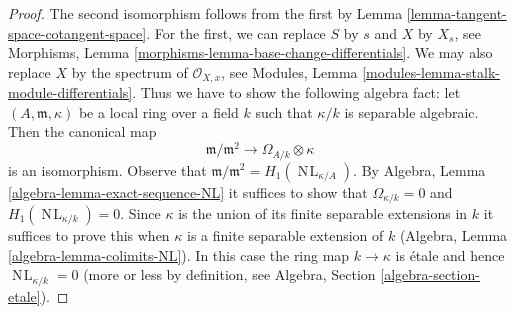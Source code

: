 \documentclass[10pt,a4paper]{amsart}
\theoremstyle{plain}
\theoremstyle{definition}
\theoremstyle{remark}
\numberwithin{equation}{subsection}
\def\NL{\mathop{N\!L}\nolimits}
\begin{document}
\begin{proof}
The second isomorphism follows from the first by
Lemma \ref{lemma-tangent-space-cotangent-space}.
For the first, we can replace $S$ by $s$ and $X$ by $X_s$, see
Morphisms, Lemma \ref{morphisms-lemma-base-change-differentials}.
We may also replace $X$ by the spectrum of $\mathcal{O}_{X, x}$, see
Modules, Lemma \ref{modules-lemma-stalk-module-differentials}.
Thus we have to show the following algebra fact: let
$(A, \mathfrak m, \kappa)$ be a local ring over a field $k$
such that $\kappa/k$ is separable algebraic. Then the canonical map
$$
\mathfrak m/\mathfrak m^2
\longrightarrow
\Omega_{A/k} \otimes \kappa
$$
is an isomorphism. Observe that
$\mathfrak m/\mathfrak m^2 = H_1(\NL_{\kappa/A})$. By
Algebra, Lemma \ref{algebra-lemma-exact-sequence-NL}
it suffices to show that $\Omega_{\kappa/k} = 0$ and
$H_1(\NL_{\kappa/k}) = 0$. Since $\kappa$ is the union of
its finite separable extensions in $k$ it suffices to prove
this when $\kappa$ is a finite separable extension of $k$
(Algebra, Lemma \ref{algebra-lemma-colimits-NL}).
In this case the ring map $k \to \kappa$ is \'etale
and hence $\NL_{\kappa/k} = 0$ (more or less by definition, see
Algebra, Section \ref{algebra-section-etale}).
\end{proof}
\end{document}
